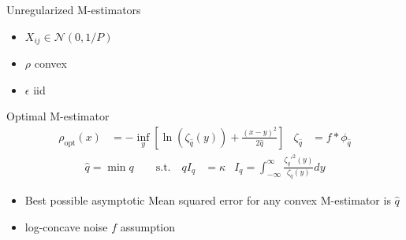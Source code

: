 \documentclass[pdf]{beamer}
\begin{document}
\begin{frame}[t]{Unregularized M-estimators}

    \begin{itemize}
    \item $X_{ij}\in \mathcal{N}(0,1/P)$
    \item $\rho$ convex 
    \item $\epsilon$ iid
    \end{itemize}

    \vspace{.2in}
    
    \begin{block}{Optimal M-estimator}
        \begin{align*}
            \rho_{\text{opt}}(x) &= -\inf_y{\left[\ln(\zeta_{\hat{q}}(y))+\frac{(x-y)^2}{2 \hat{q}}\right]} & \zeta_{\hat{q}} &= f*\phi_{\hat{q}}
        \end{align*}
        \begin{align*}
           \hat{q} = \min{q} \quad \quad \text{s.t.} \quad q I_{q} &=\kappa & I_{q} = \int_{-\infty}^{\infty}{\frac{\zeta_{q}'^2(y)}{\zeta_{q}(y)}dy}
        \end{align*}


        \begin{itemize}
        \vspace{.1in}
        \item Best possible asymptotic Mean squared error for any convex M-estimator is $\hat{q}$
            \vspace{.1in}
        \item log-concave noise $f$ assumption
        \end{itemize}

    \end{block}

\end{frame}
\end{document}
